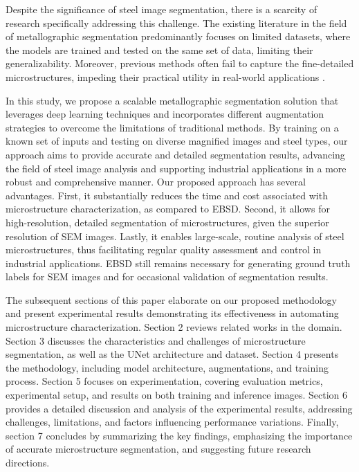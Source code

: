 \documentclass[]{article}
\begin{document}
Despite the significance of steel image segmentation, there is a scarcity of research specifically addressing this challenge. The existing literature in the field of metallographic segmentation predominantly focuses on limited datasets, where the models are trained and tested on the same set of data, limiting their generalizability. Moreover, previous methods often fail to capture the fine-detailed microstructures, impeding their practical utility in real-world applications \cite{LeCun2015, GoodBengCour16}.

In this study, we propose a scalable metallographic segmentation solution that leverages deep learning techniques and incorporates different augmentation strategies to overcome the limitations of traditional methods. By training on a known set of inputs and testing on diverse magnified images and steel types, our approach aims to provide accurate and detailed segmentation results, advancing the field of steel image analysis and supporting industrial applications in a more robust and comprehensive manner. Our proposed approach has several advantages. First, it substantially reduces the time and cost associated with microstructure characterization, as compared to EBSD. Second, it allows for high-resolution, detailed segmentation of microstructures, given the superior resolution of SEM images. Lastly, it enables large-scale, routine analysis of steel microstructures, thus facilitating regular quality assessment and control in industrial applications. EBSD still remains necessary for generating ground truth labels for SEM images and for occasional validation of segmentation results.

The subsequent sections of this paper elaborate on our proposed methodology and present experimental results demonstrating its effectiveness in automating microstructure characterization. Section 2 reviews related works in the domain. Section 3 discusses the characteristics and challenges of microstructure segmentation, as well as the UNet architecture and dataset. Section 4 presents the methodology, including model architecture, augmentations, and training process. Section 5 focuses on experimentation, covering evaluation metrics, experimental setup, and results on both training and inference images. Section 6 provides a detailed discussion and analysis of the experimental results, addressing challenges, limitations, and factors influencing performance variations. Finally, section 7 concludes by summarizing the key findings, emphasizing the importance of accurate microstructure segmentation, and suggesting future research directions.
\end{document}
